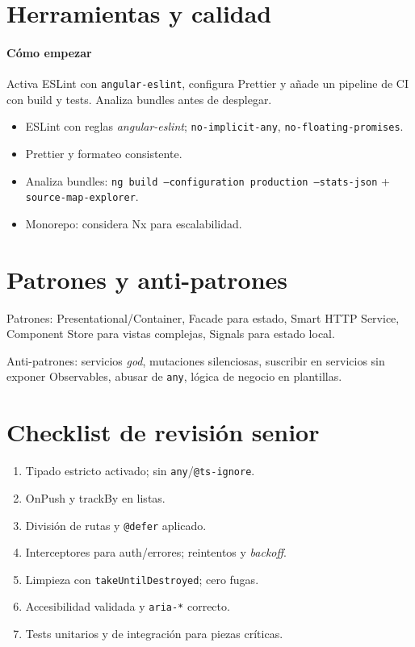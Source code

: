 \documentclass[11pt,a4paper]{article}
\begin{document}
\section{Herramientas y calidad}
\paragraph{Cómo empezar}
Activa ESLint con \texttt{angular-eslint}, configura Prettier y añade un pipeline de CI con build y tests. Analiza bundles antes de desplegar.

\begin{itemize}[leftmargin=*]
  \item ESLint con reglas \emph{angular-eslint}; \texttt{no-implicit-any}, \texttt{no-floating-promises}.
  \item Prettier y formateo consistente.
  \item Analiza bundles: \texttt{ng build --configuration production --stats-json} + \texttt{source-map-explorer}.
  \item Monorepo: considera Nx para escalabilidad.
\end{itemize}

\section{Patrones y anti-patrones}
\begin{refbox}
Patrones: Presentational/Container, Facade para estado, Smart HTTP Service, Component Store para vistas complejas, Signals para estado local.
\end{refbox}

\begin{warnbox}
Anti-patrones: servicios \emph{god}, mutaciones silenciosas, suscribir en servicios sin exponer Observables, abusar de \texttt{any}, lógica de negocio en plantillas.
\end{warnbox}

\section{Checklist de revisión senior}
\begin{enumerate}[leftmargin=*]
  \item Tipado estricto activado; sin \texttt{any}/\texttt{@ts-ignore}.
  \item OnPush y trackBy en listas.
  \item División de rutas y \texttt{@defer} aplicado.
  \item Interceptores para auth/errores; reintentos y \emph{backoff}.
  \item Limpieza con \texttt{takeUntilDestroyed}; cero fugas.
  \item Accesibilidad validada y \texttt{aria-*} correcto.
  \item Tests unitarios y de integración para piezas críticas.
\end{enumerate}
\end{document}
